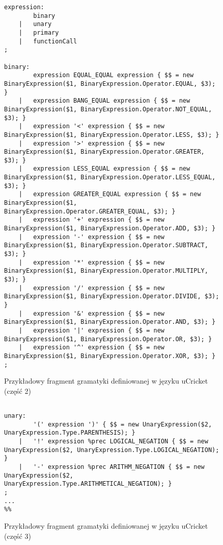 \begin{figure}
\begin{lstlisting}
expression:
        binary
    |   unary
    |   primary
    |   functionCall
;

binary:
        expression EQUAL_EQUAL expression { $$ = new BinaryExpression($1, BinaryExpression.Operator.EQUAL, $3); }
    |   expression BANG_EQUAL expression { $$ = new BinaryExpression($1, BinaryExpression.Operator.NOT_EQUAL, $3); }
    |   expression '<' expression { $$ = new BinaryExpression($1, BinaryExpression.Operator.LESS, $3); }
    |   expression '>' expression { $$ = new BinaryExpression($1, BinaryExpression.Operator.GREATER, $3); }
    |   expression LESS_EQUAL expression { $$ = new BinaryExpression($1, BinaryExpression.Operator.LESS_EQUAL, $3); }
    |   expression GREATER_EQUAL expression { $$ = new BinaryExpression($1, BinaryExpression.Operator.GREATER_EQUAL, $3); }
    |   expression '+' expression { $$ = new BinaryExpression($1, BinaryExpression.Operator.ADD, $3); }
    |   expression '-' expression { $$ = new BinaryExpression($1, BinaryExpression.Operator.SUBTRACT, $3); }
    |   expression '*' expression { $$ = new BinaryExpression($1, BinaryExpression.Operator.MULTIPLY, $3); }
    |   expression '/' expression { $$ = new BinaryExpression($1, BinaryExpression.Operator.DIVIDE, $3); }
    |   expression '&' expression { $$ = new BinaryExpression($1, BinaryExpression.Operator.AND, $3); }
    |   expression '|' expression { $$ = new BinaryExpression($1, BinaryExpression.Operator.OR, $3); }
    |   expression '^' expression { $$ = new BinaryExpression($1, BinaryExpression.Operator.XOR, $3); }
;
\end{lstlisting}
\caption{Przykładowy fragment gramatyki definiowanej w języku uCricket (część 2)}
\label{fig:lst:parser-gramatyka:2}
\end{figure} 

\begin{figure}
\begin{lstlisting}

unary:
        '(' expression ')' { $$ = new UnaryExpression($2, UnaryExpression.Type.PARENTHESIS); }
    |   '!' expression %prec LOGICAL_NEGATION { $$ = new UnaryExpression($2, UnaryExpression.Type.LOGICAL_NEGATION); }
    |   '-' expression %prec ARITHM_NEGATION { $$ = new UnaryExpression($2, UnaryExpression.Type.ARITHMETICAL_NEGATION); }
;
...
%%
\end{lstlisting}
\caption{Przykładowy fragment gramatyki definiowanej w języku uCricket (część 3)}
\label{fig:lst:parser-gramatyka:3}
\end{figure}

